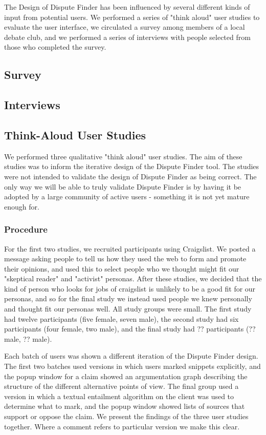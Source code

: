 \documentclass{www2010-submission}
\begin{document}
The Design of Dispute Finder has been influenced by several different kinds of input from potential users. We performed a series of "think aloud" user studies to evaluate the user interface, we circulated a survey among members of a local debate club, and we performed a series of interviews with people selected from those who completed the survey.

\subsection{Survey}

\subsection{Interviews}

\subsection{Think-Aloud User Studies}

We performed three qualitative "think aloud" user studies. The aim of these studies was to inform the iterative design of the Dispute Finder tool. The studies were not intended to validate the design of Dispute Finder as being correct. The only way we will be able to truly validate Dispute Finder is by having it be adopted by a large community of active users - something it is not yet mature enough for.

\subsubsection{Procedure}

For the first two studies, we recruited participants using Craigslist. We posted a message asking people to tell us how they used the web to form and promote their opinions, and used this to select people who we thought might fit our "skeptical reader" and "activist" personas. After these studies, we decided that the kind of person who looks for jobs of craigslist is unlikely to be a good fit for our personas, and so for the final study we instead used people we knew personally and thought fit our personas well. All study groups were small. The first study had twelve participants (five female, seven male), the second study had six participants (four female, two male), and the final study had ?? participants (?? male, ?? male). 

Each batch of users was shown a different iteration of the Dispute Finder design. The first two batches used versions in which users marked snippets explicitly, and the popup window for a claim showed an argumentation graph describing the structure of the different alternative points of view. The final group used a version in which a textual entailment algorithm on the client was used to determine what to mark, and the popup window showed lists of sources that support or oppose the claim. We present the findings of the three user studies together. Where a comment refers to particular version we make this clear.
\end{document}
